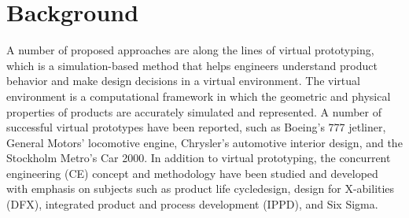 \section{Background}

A number of proposed approaches are along the lines of virtual prototyping,  which
is  a  simulation-based  method  that  helps  engineers
understand product behavior and make design decisions in a virtual environment.
The virtual environment is a computational framework in which the geometric and
physical properties of products are accurately simulated and represented. A number
of successful virtual prototypes have  been  reported, such as  Boeing’s 777 jetliner,
General Motors’ locomotive engine, Chrysler’s automotive interior design,
and the Stockholm Metro’s Car 2000. In addition to virtual prototyping,
the concurrent engineering (CE) concept and methodology have been studied
and developed with emphasis on subjects such as product life cycledesign,
design for X-abilities (DFX), integrated product and process development (IPPD), and Six Sigma.
